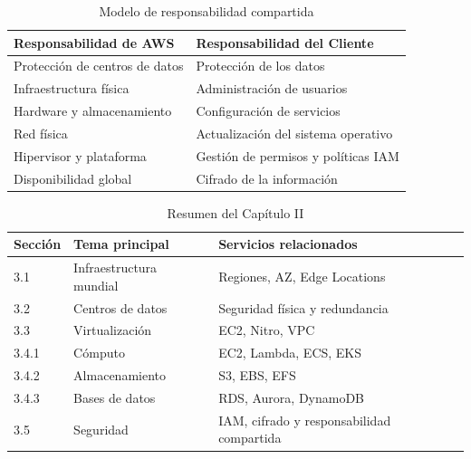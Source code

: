\documentclass[12pt,a4paper]{article}
\begin{document}
\begin{table}[H]
\centering
\caption{Modelo de responsabilidad compartida}
\begin{tabularx}{\textwidth}{XX}
\toprule
\textbf{Responsabilidad de AWS} & \textbf{Responsabilidad del Cliente}\\
\midrule
Protección de centros de datos & Protección de los datos\\

Infraestructura física & Administración de usuarios\\

Hardware y almacenamiento & Configuración de servicios\\

Red física & Actualización del sistema operativo\\

Hipervisor y plataforma & Gestión de permisos y políticas IAM\\

Disponibilidad global & Cifrado de la información\\
\bottomrule
\end{tabularx}
\end{table}

\begin{table}[H]
\centering
\caption{Resumen del Capítulo II}
\begin{tabularx}{\textwidth}{lXX}
\toprule
\textbf{Sección} & \textbf{Tema principal} & \textbf{Servicios relacionados}\\
\midrule
3.1 & Infraestructura mundial & Regiones, AZ, Edge Locations\\

3.2 & Centros de datos & Seguridad física y redundancia\\

3.3 & Virtualización & EC2, Nitro, VPC\\

3.4.1 & Cómputo & EC2, Lambda, ECS, EKS\\

3.4.2 & Almacenamiento & S3, EBS, EFS\\

3.4.3 & Bases de datos & RDS, Aurora, DynamoDB\\

3.5 & Seguridad & IAM, cifrado y responsabilidad compartida\\
\bottomrule
\end{tabularx}
\end{table}
\end{document}
